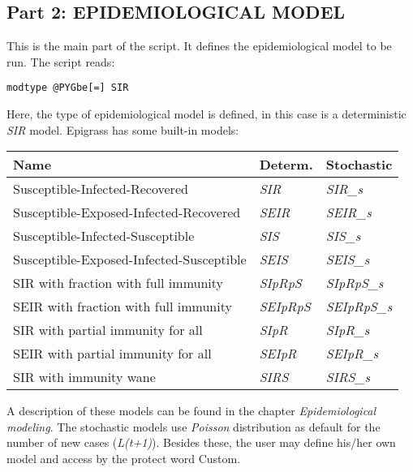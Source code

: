 \documentclass[a4paper,10pt]{manual}
\begin{document}
\subsection{Part 2: EPIDEMIOLOGICAL MODEL}

This is the main part of the script. It defines the epidemiological model to be run.
The script reads:

\begin{Verbatim}[commandchars=@\[\]]
modtype @PYGbe[=] SIR
\end{Verbatim}

Here, the type of epidemiological model is defined, in this case is a deterministic \emph{SIR} model. Epigrass has some built-in models:

\begin{tabulary}{\textwidth}{|L|L|L|}
\hline
\textbf{
Name
} & \textbf{
Determ.
} & \textbf{
Stochastic
}\\
\hline

Susceptible-Infected-Recovered
 & 
\emph{SIR}
 & 
\emph{SIR\_s}
\\

Susceptible-Exposed-Infected-Recovered
 & 
\emph{SEIR}
 & 
\emph{SEIR\_s}
\\

Susceptible-Infected-Susceptible
 & 
\emph{SIS}
 & 
\emph{SIS\_s}
\\

Susceptible-Exposed-Infected-Susceptible
 & 
\emph{SEIS}
 & 
\emph{SEIS\_s}
\\

SIR with fraction with full immunity
 & 
\emph{SIpRpS}
 & 
\emph{SIpRpS\_s}
\\

SEIR with fraction with full immunity
 & 
\emph{SEIpRpS}
 & 
\emph{SEIpRpS\_s}
\\

SIR with partial immunity for all
 & 
\emph{SIpR}
 & 
\emph{SIpR\_s}
\\

SEIR with partial immunity for all
 & 
\emph{SEIpR}
 & 
\emph{SEIpR\_s}
\\

SIR with immunity wane
 & 
\emph{SIRS}
 & 
\emph{SIRS\_s}
\\
\hline
\end{tabulary}


A description of these models can be found in the chapter \emph{Epidemiological modeling}. The stochastic models use \emph{Poisson} distribution as default for the number of new cases (\emph{L(t+1)}). Besides these, the user may define his/her own model and access by the protect word Custom.
\end{document}
